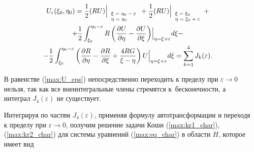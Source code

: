 \begin{multline}

\label{max:U_eps}

 U_{\varepsilon}(\xi_0,\eta_0)=\frac{1}{2}(RU)\Bigr|_{\scriptsize{

\begin{array}{l}

\xi=\eta_0-\varepsilon\\

\eta=\eta_0 

 \end{array} }}+

\frac{1}{2}(RU)\Bigr|_{\scriptsize{

\begin{array}{l}

\xi=\xi_0\\

\eta=\xi_0 +\varepsilon

 \end{array} }} +

 \\

+\frac{1}{2}\int_{\xi_0}^{\eta_0-\varepsilon}R\left(\frac{\partial U}{\partial \eta}-\frac{\partial U}{\partial \xi}\right)\Bigr|_{\eta=\xi+\varepsilon} d\xi - \\ - \frac{1}{2}\int_{\xi_0}^{\eta_0-\varepsilon} \left(

\frac{\partial R}{\partial \eta} - \frac{\partial R}{\partial \xi} + \frac{4RG}{\xi-\eta}

\right)U\Bigr|_{\eta=\xi+\varepsilon}d\xi=\sum\limits_{k=1}^{4}J_{k}(\varepsilon).

\end{multline}



В равенстве (\ref{max:U_eps}) непосредственно переходить к пределу при $\varepsilon\rightarrow 0$ нельзя, так как все внеинтегральные члены стремятся к~бесконечности, а интеграл $J_4(\varepsilon)$ не существует. 

Интегрируя по частям  $J_4(\varepsilon)$, применяя формулу автотрансформации и переходя к пределу при $\varepsilon\to 0$, получим решение задачи Коши (\ref{max:kr1_char}), (\ref{max:kr2_char}) для системы уравнений (\ref{max:eq_char}) в области $H$, которое имеет вид


